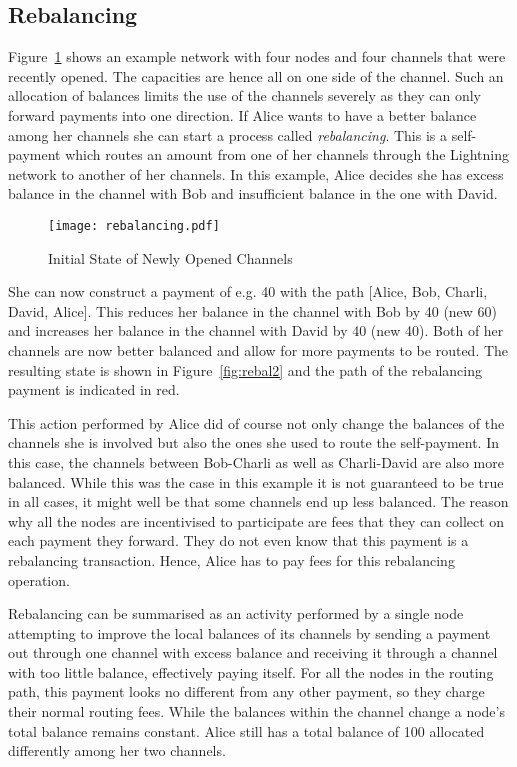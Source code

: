 \documentclass[final]{fhnwreport}       %
\begin{document}
\subsection{Rebalancing}\label{subsec:rebalancing}
Figure~\ref{fig:rebal} shows an example network with four nodes and four channels that were recently opened. The capacities are hence all on one side of the channel. Such an allocation of balances limits the use of the channels severely as they can only forward payments into one direction. If Alice wants to have a better balance among her channels she can start a process called \emph{rebalancing}. This is a self-payment which routes an amount from one of her channels through the Lightning network to another of her channels. In this example, Alice decides she has excess balance in the channel with Bob and insufficient balance in the one with David.

\begin{figure}[H]
\centering
\texttt{[image: rebalancing.pdf]}
\caption{Initial State of Newly Opened Channels}
\label{fig:rebal}
\end{figure}

She can now construct a payment of e.g. 40 with the path [Alice, Bob, Charli, David, Alice]. This reduces her balance in the channel with Bob by 40 (new 60) and increases her balance in the channel with David by 40 (new 40). Both of her channels are now better balanced and allow for more payments to be routed. The resulting state is shown in Figure~\ref{fig:rebal2} and the path of the rebalancing payment is indicated in red. 

This action performed by Alice did of course not only change the balances of the channels she is involved but also the ones she used to route the self-payment. In this case, the channels between Bob-Charli as well as Charli-David are also more balanced. While this was the case in this example it is not guaranteed to be true in all cases, it might well be that some channels end up less balanced. The reason why all the nodes are incentivised to participate are fees that they can collect on each payment they forward. They do not even know that this payment is a rebalancing transaction. Hence, Alice has to pay fees for this rebalancing operation. 


Rebalancing can be summarised as an activity performed by a single node attempting to improve the local balances of its channels by sending a payment out through one channel with excess balance and receiving it through a channel with too little balance, effectively paying itself. For all the nodes in the routing path, this payment looks no different from any other payment, so they charge their normal routing fees. While the balances within the channel change a node's total balance remains constant. Alice still has a total balance of 100 allocated differently among her two channels. 
\end{document}

